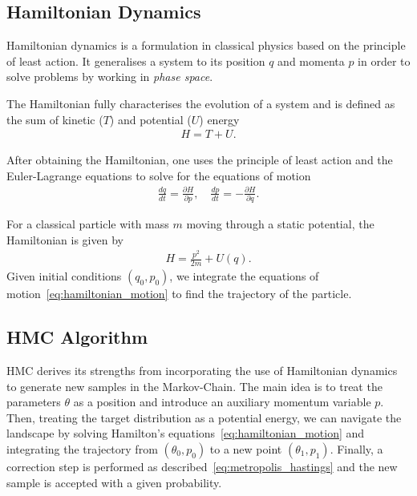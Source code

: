 \documentclass[11pt]{article}
\begin{document}
\subsection{Hamiltonian Dynamics}\label{subsec:hamiltonian_dynamics}
    Hamiltonian dynamics is a formulation in classical physics based on the principle of least action.
    It generalises a system to its position $q$ and momenta $p$ in order to solve problems by working in \emph{phase space}.

    The Hamiltonian fully characterises the evolution of a system and is defined as the sum of kinetic ($T$) and
    potential ($U$) energy
    \begin{equation}\label{eq:hamiltonian_definition}
    \begin{aligned}
        H = T + U.
    \end{aligned}
    \end{equation}

    After obtaining the Hamiltonian, one uses the principle of least action and the Euler-Lagrange equations to solve for
    the equations of motion
    \begin{equation}\label{eq:hamiltonian_motion}
    \begin{aligned}
        \frac{dq}{dt} = \frac{\partial H}{\partial p}, \quad \frac{dp}{dt} = -\frac{\partial H}{\partial q}.
    \end{aligned}
    \end{equation}

    For a classical particle with mass $m$ moving through a static potential, the Hamiltonian is given by
    \begin{equation}\label{eq:classic_hamiltonian}
    \begin{aligned}
        H = \frac{p^2}{2m} + U(q).
    \end{aligned}
    \end{equation}
    Given initial conditions $(q_0, p_0)$, we integrate the equations of motion~\ref{eq:hamiltonian_motion} to find
    the trajectory of the particle.

\subsection{HMC Algorithm}\label{subsec:hmc_algorithm}
    HMC derives its strengths from incorporating the use of Hamiltonian dynamics to generate new samples in the Markov-Chain.
    The main idea is to treat the parameters $\theta$ as a position and introduce an auxiliary momentum variable $p$.
    Then, treating the target distribution as a potential energy, we can navigate the landscape by solving Hamilton's
    equations~\ref{eq:hamiltonian_motion} and integrating the trajectory from $(\theta_0, p_0)$ to a new point
    $(\theta_1, p_1)$.
    Finally, a correction step is performed as described~\ref{eq:metropolis_hastings} and the new sample is accepted
    with a given probability.
\end{document}
